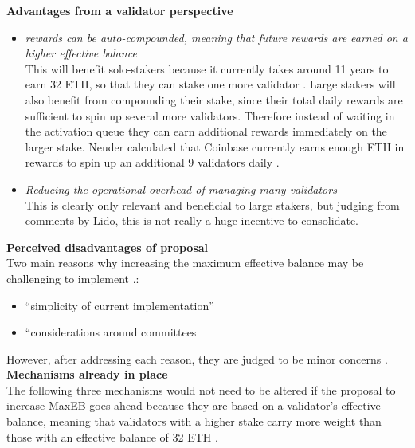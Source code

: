 \documentclass{article}
\begin{document}
\noindent \textbf{Advantages from a validator perspective}
\begin{itemize}
  \item \textit{rewards can be auto-compounded, meaning that future rewards are
    earned on a higher effective balance}\\
    This will benefit solo-stakers because it currently takes around 11 years
    to earn 32 ETH, so that they can stake one more validator
    \cite{Neuder2023a}. Large stakers will also benefit from compounding their
    stake, since their total daily rewards are sufficient to spin up several
    more validators. Therefore instead of waiting in the activation queue they
    can earn additional rewards immediately on the larger stake. Neuder
    calculated that Coinbase currently earns enough ETH in rewards to spin up
    an additional 9 validators daily  \cite{Neuder2023a}.  
  \item \textit{Reducing the operational overhead of managing many validators}
    \\ This is clearly only relevant and beneficial to large stakers, but
    judging from \href{https://hackmd.io/wPqtVNjPTYa_tO5HEtq4_g}{comments by
    Lido}, this is not really a huge incentive to consolidate.
\end{itemize}

\noindent \textbf{Perceived disadvantages of proposal}\\
Two main reasons why increasing the maximum effective balance may be
challenging to implement \cite{Neuder2023a}.: 
\begin{itemize}
  \item ``simplicity of current implementation''
  \item ``considerations around committees
\end{itemize}

However, after addressing each reason, they are judged to be minor concerns 
\cite{Neuder2023a}.\\

\noindent \textbf{Mechanisms already in place}\\
The following three mechanisms would not need to be altered if the proposal to
increase MaxEB goes ahead because they are based on a validator's effective
balance, meaning that validators with a higher stake carry more weight than
those with an effective balance of 32 ETH \cite{Neuder2023a}.
\end{document}
